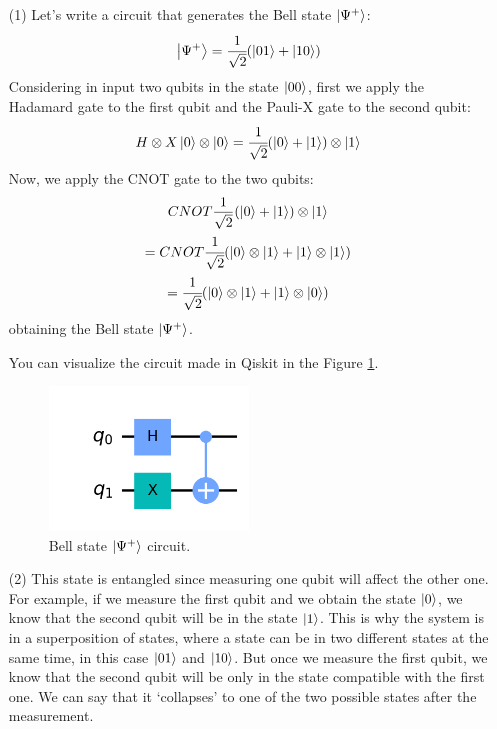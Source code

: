 \documentclass[12pt]{article}
\begin{document}
\begin{itemize}

\item[(1)]
Let's write a circuit that generates the Bell state $\ket{\Psi^+}$:
\begin{gather*}
    \ket{\Psi^+} = \cfrac{1}{\sqrt{2}} (\ket{01} + \ket{10}) \\
\end{gather*}
Considering in input two qubits in the state $\ket{00}$, first we apply the Hadamard gate 
to the first qubit and the Pauli-X gate to the second qubit:
\begin{gather*}
    H \otimes X \ket{0} \otimes \ket{0} = \cfrac{1}{\sqrt{2}} (\ket 0 + \ket 1) \otimes \ket 1
\end{gather*}
Now, we apply the CNOT gate to the two qubits:
\begin{gather*}
    CNOT \frac{1}{\sqrt{2}} (\ket 0 + \ket 1) \otimes \ket 1 \\
    = CNOT \cfrac{1}{\sqrt{2}} (\ket{0} \otimes \ket{1} + \ket{1} \otimes \ket{1}) \\
    = \cfrac{1}{\sqrt{2}} (\ket{0} \otimes \ket{1} + \ket{1} \otimes \ket{0})
\end{gather*}
obtaining the Bell state $\ket{\Psi^+}$.

You can visualize the circuit made in Qiskit in the Figure \ref{fig:bell_state}.
\begin{figure}[h]
    \centering
    \includegraphics[width=0.5\textwidth]{images/bell_state.png}
    \caption{Bell state $\ket{\Psi^+}$ circuit.}
    \label{fig:bell_state}
\end{figure}

\item[(2)]
This state is entangled since measuring one qubit will affect the other one.
For example, if we measure the first qubit and we obtain the state $\ket 0$,
we know that the second qubit will be in the state $\ket 1$. This is why
the system is in a superposition of states, where a state can be in two
different states at the same time, in this case $\ket{01}$ and $\ket{10}$.
But once we measure the first qubit, we know that the second qubit will be
only in the state compatible with the first one. We can say that it `collapses'
to one of the two possible states after the measurement.


\end{itemize}
\end{document}
